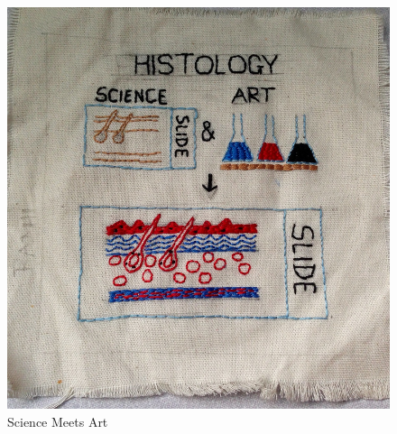 \documentclass[usenames,dvipsnames]{beamer}
\begin{document}
\begin{frame}
\begin{columns}[t]
\begin{column}{.48\textwidth}
\begin{figure}[ht]
        \includegraphics[width=1.0\textwidth,keepaspectratio]{figures/histology_art.jpg}
        \caption*{Science Meets Art\label{fig:histology-art}}
      \end{figure}
    \end{column}
  \end{columns}
\end{frame}
\end{document}
